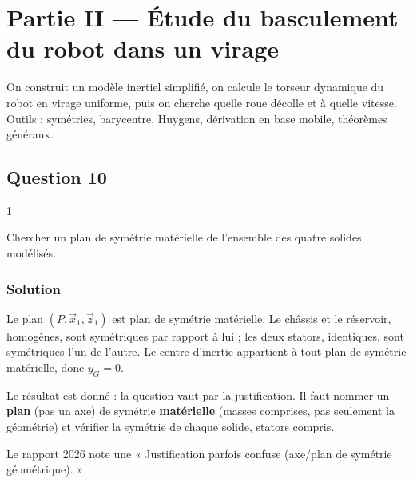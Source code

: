 \documentclass[11pt,a4paper]{article}
\begin{document}
\hypertarget{partie-ii-uxe9tude-du-basculement-du-robot-dans-un-virage}{%
\section{Partie II --- Étude du basculement du robot dans un virage}\label{partie-ii-uxe9tude-du-basculement-du-robot-dans-un-virage}}

On construit un modèle inertiel simplifié, on calcule le torseur dynamique du robot en virage uniforme, puis on cherche quelle roue décolle et à quelle vitesse. Outils : symétries, barycentre, Huygens, dérivation en base mobile, théorèmes généraux.

\hypertarget{question-10}{%
\subsection{Question 10}\label{question-10}}

\begin{indication}{1}

Chercher un plan de symétrie matérielle de l'ensemble des quatre solides modélisés.

\end{indication}

\hypertarget{solution-9}{%
\subsubsection{Solution}\label{solution-9}}

Le plan \((P,\vec x_1,\vec z_1)\) est plan de symétrie matérielle. Le châssis et le réservoir, homogènes, sont symétriques par rapport à lui ; les deux stators, identiques, sont symétriques l'un de l'autre. Le centre d'inertie appartient à tout plan de symétrie matérielle, donc \(\boxed{y_G = 0}\).

\begin{piege}

Le résultat est donné : la question vaut par la justification. Il faut nommer un \textbf{plan} (pas un axe) de symétrie \textbf{matérielle} (masses comprises, pas seulement la géométrie) et vérifier la symétrie de chaque solide, stators compris.

\end{piege}

\begin{jury}

Le rapport 2026 note une « Justification parfois confuse (axe/plan de symétrie géométrique). »

\end{jury}
\end{document}
